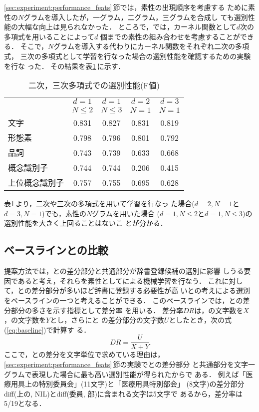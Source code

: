 \ref{sec:experiment:performance_feats}\,節では，素性の出現順序を考慮する
ために素性の$N$グラムを導入したが，一グラム，二グラム，三グラムを合成し
ても選別性能の大幅な向上は見られなかった．
ところで，{\SVM}では，カーネル関数として$d$次の多項式を用いることによって$d$
個までの素性の組み合わせを考慮することができる．
そこで，$N$グラムを導入する代わりにカーネル関数をそれぞれ二次の多項式，
三次の多項式として学習を行なった場合の選別性能を確認するための実験を行な
った．
その結果を表\ref{tab:fvalue_poly23}\,に示す．
\begin{table}[htbp]
\caption{二次，三次多項式での選別性能(F値)}
\label{tab:fvalue_poly23}
\begin{center}
\begin{tabular}{|l|c|c|c|c|}\hline
 & $d = 1$ & $d = 1$ & $d = 2$ & $d = 3$ \\
 & $ N \le 2$ & $N \le 3$ & $N = 1$ & $N = 1$ \\\hline
文字           & 0.831 & 0.827 & 0.831 & 0.819 \\
形態素         & 0.798 & 0.796 & 0.801 & 0.792 \\
品詞           & 0.743 & 0.739 & 0.633 & 0.668 \\
概念識別子     & 0.744 & 0.744 & 0.206 & 0.415 \\
上位概念識別子 & 0.757 & 0.755 & 0.695 & 0.628 \\\hline
\end{tabular}
\end{center}
\end{table}

表\ref{tab:fvalue_poly23}\,より，二次や三次の多項式を用いて学習を行なっ
た場合($d = 2, N = 1$と$d = 3, N = 1$)でも，素性の$N$グラムを用いた場合
($d = 1, N \le 2$と$d = 1, N \le 3$)の選別性能を大きく上回ることはないこ
とが分かる．


\subsection{ベースラインとの比較}

提案方法では，{\CT}と{\NT}の差分部分と共通部分が辞書登録候補の選別に影響
しうる要因であると考え，それらを素性として{\SVM}による機械学習を行なう．
これに対して，{\CT}と{\NT}の差分部分が多いほど辞書に登録する必要性が高
いとの考えによる選別をベースラインの一つと考えることができる．
このベースラインでは，{\CT}と{\NT}の差分部分の多さを示す指標として差分率
を用いる．
差分率$DR$は，{\CT}の文字数を$X$，{\NT}の文字数を$Y$とし，さらに{\CT}と
{\NT}の差分部分の文字数$U$としたとき，次の式(\ref{eq:baseline})で計算す
る．
\begin{equation}
DR = \frac{U}{X + Y}
\label{eq:baseline}
\end{equation}
ここで，{\CT}と{\NT}の差分を文字単位で求めている理由は，
\ref{sec:experiment:performance_feats}\,節の実験で{\CT}と{\NT}の差分部分
と共通部分を文字一グラムで表現した場合に最も高い選別性能が得られたからで
ある．
例えば{\CT}「医療用具上の特別委員会」(11文字)と{\NT}「医療用具特別部会」
(8文字)の差分部分diff(上の, NIL)とdiff(委員, 部)に含まれる文字は5文字で
あるから，差分率は5/19となる．

